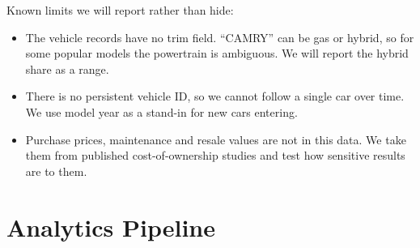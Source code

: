 \documentclass[11pt]{article}
\begin{document}
\noindent Known limits we will report rather than hide:
\begin{itemize}
  \item The vehicle records have no trim field. ``CAMRY'' can be gas or hybrid, so for some popular models the powertrain is ambiguous. We will report the hybrid share as a range.
  \item There is no persistent vehicle ID, so we cannot follow a single car over time. We use model year as a stand-in for new cars entering.
  \item Purchase prices, maintenance and resale values are not in this data. We take them from published cost-of-ownership studies and test how sensitive results are to them.
\end{itemize}

\section{Analytics Pipeline}
\end{document}
